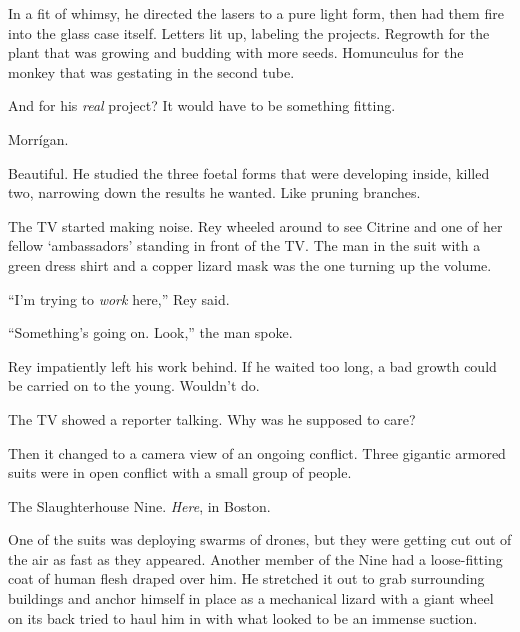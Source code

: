 In a fit of whimsy, he directed the lasers to a pure light form, then had them fire into the glass case itself.  Letters lit up, labeling the projects.  Regrowth for the plant that was growing and budding with more seeds.  Homunculus for the monkey that was gestating in the second tube.



And for his \emph{real }project?  It would have to be something fitting.



Morr\'{i}gan.



Beautiful.  He studied the three foetal forms that were developing inside, killed two, narrowing down the results he wanted.  Like pruning branches.



The TV started making noise.  Rey wheeled around to see Citrine and one of her fellow `ambassadors' standing in front of the TV.  The man in the suit with a green dress shirt and a copper lizard mask was the one turning up the volume.



``I'm trying to \emph{work} here,'' Rey said.



``Something's going on.  Look,'' the man spoke.



Rey impatiently left his work behind.  If he waited too long, a bad growth could be carried on to the young.  Wouldn't do.



The TV showed a reporter talking.  Why was he supposed to care?



Then it changed to a camera view of an ongoing conflict.  Three gigantic armored suits were in open conflict with a small group of people.



The Slaughterhouse Nine.  \emph{Here}, in Boston.



One of the suits was deploying swarms of drones, but they were getting cut out of the air as fast as they appeared.  Another member of the Nine had a loose-fitting coat of human flesh draped over him.  He stretched it out to grab surrounding buildings and anchor himself in place as a mechanical lizard with a giant wheel on its back tried to haul him in with what looked to be an immense suction.



